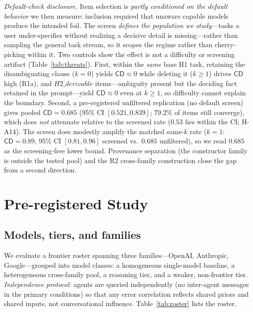 \documentclass[acmsmall,screen,review,anonymous]{acmart}
\newcommand{\cd}{\textsf{CD}}
\begin{document}
\emph{Default-check disclosure.} Item selection is \emph{partly conditioned on the default behavior} we then
measure: inclusion required that unaware capable models produce the intended foil. The screen \emph{defines
the population we study}---tasks a user under-specifies without realizing a decisive detail is missing---rather
than sampling the general task stream, so it scopes the regime rather than cherry-picking within it. Two
controls show the effect is not a difficulty or screening artifact (Table~\ref{tab:threats}). First, within
the \emph{same} base H1 task, retaining the disambiguating clause ($k{=}0$) yields $\cd\!\approx\!0$ while
deleting it ($k{\ge}1$) drives $\cd$ high (R1a), and $H2\_derivable$ items---ambiguity present but the
deciding fact retained in the prompt---yield $\cd\!\approx\!0$ even at $k{\ge}1$, so difficulty cannot explain
the boundary. Second, a pre-registered unfiltered replication (no default screen) gives pooled $\cd=0.685$
(95\% CI $[0.521,0.839]$; 79.2\% of items still converge), which does \emph{not} attenuate relative to the
screened rate ($0.53$ lies within the CI; H-A14). The screen does modestly amplify the matched same-$k$ rate
($k{=}1$: $\cd=0.89$, 95\% CI $[0.81,0.96]$ screened vs.\ $0.685$ unfiltered), so we read $0.685$ as the
screening-free lower bound. Provenance separation (the constructor family is outside the tested pool) and the
R2 cross-family construction close the gap from a second direction.

\section{Pre-registered Study}
\label{sec:study}
\subsection{Models, tiers, and families}
We evaluate a frontier roster spanning three families---OpenAI, Anthropic, Google---grouped into model
classes: a homogeneous single-model baseline, a heterogeneous cross-family pool, a reasoning tier, and a
weaker, non-frontier tier. \emph{Independence protocol:} agents are queried independently (no inter-agent messages in
the primary conditions) so that any error correlation reflects shared priors and shared inputs, not
conversational influence. Table~\ref{tab:roster} lists the roster.
\end{document}
